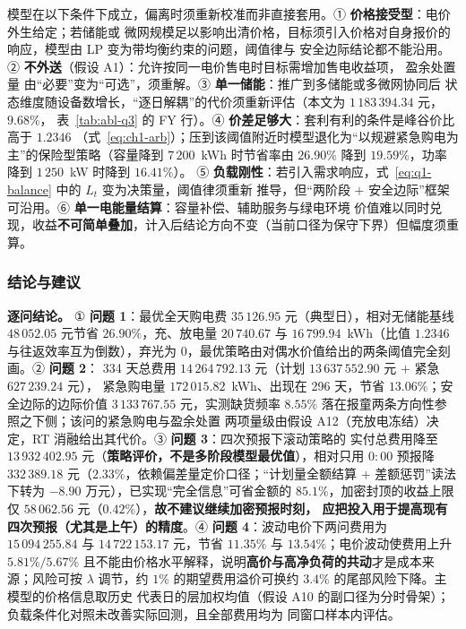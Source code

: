 模型在以下条件下成立，偏离时须重新校准而非直接套用。① \textbf{价格接受型}：电价外生给定；若储能或
微网规模足以影响出清价格，目标须引入价格对自身报价的响应，模型由 LP 变为带均衡约束的问题，阈值律与
安全边际结论都不能沿用。② \textbf{不外送}（假设 A1）：允许按同一电价售电时目标需增加售电收益项，
盈余处置量  由“必要”变为“可选”，须重解。③ \textbf{单一储能}：推广到多储能或多微网协同后
状态维度随设备数增长，“逐日解耦”的代价须重新评估（本文为 \(1\,183\,394.34\) 元，\(9.68\%\)，
表~\ref{tab:abl-q3} 的 FY 行）。④ \textbf{价差足够大}：套利有利的条件是峰谷价比高于 \(1.2346\)
（式~\eqref{eq:ch1-arb}）；压到该阈值附近时模型退化为“以规避紧急购电为主”的保险型策略（容量降到
\(7\,200\)~kWh 时节省率由 \(26.90\%\) 降到 \(19.59\%\)，功率降到 \(1\,250\)~kW 时降到 \(16.41\%\)）。
⑤ \textbf{负载刚性}：若引入需求响应，式~\eqref{eq:q1-balance} 中的 \(L_t\) 变为决策量，阈值律须重新
推导，但“两阶段 \(+\) 安全边际”框架可沿用。⑥ \textbf{单一电能量结算}：容量补偿、辅助服务与绿电环境
价值难以同时兑现，收益\textbf{不可简单叠加}，计入后结论方向不变（当前口径为保守下界）但幅度须重算。

\subsubsection{结论与建议}

\textbf{逐问结论。} ① \textbf{问题 1}：最优全天购电费 \(35\,126.95\) 元（典型日），相对无储能基线
\(48\,052.05\) 元节省 \(26.90\%\)，充、放电量 \(20\,740.67\) 与 \(16\,799.94\)~kWh（比值 \(1.2346\)
与往返效率互为倒数），弃光为 0，最优策略由对偶水价值给出的两条阈值完全刻画。② \textbf{问题 2}：
334 天总费用 \(14\,264\,792.13\) 元（计划 \(13\,637\,552.90\) 元 \(+\) 紧急 \(627\,239.24\) 元），
紧急购电量 \(172\,015.82\)~kWh、出现在 296 天，节省 \(13.06\%\)；安全边际的边际价值
\(3\,133\,767.55\) 元，实测缺货频率 \(8.55\%\) 落在报童两条方向性参照之下侧；该问的紧急购电与盈余处置
两项量级由假设 A12（充放电冻结）决定，RT 消融给出其代价。③ \textbf{问题 3}：四次预报下滚动策略的
实付总费用降至 \(13\,932\,402.95\) 元（\textbf{策略评价，不是多阶段模型最优值}），相对只用 \(0{:}00\)
预报降 \(332\,389.18\) 元（\(2.33\%\)，依赖偏差量定价口径；“计划量全额结算 \(+\) 差额惩罚”读法下转为
\(-8.90\) 万元），已实现“完全信息”可省金额的
\(85.1\%\)，加密封顶的收益上限仅 \(58\,062.56\) 元（\(0.42\%\)），\textbf{故不建议继续加密预报时刻，
应把投入用于提高现有四次预报（尤其是上午）的精度}。④ \textbf{问题 4}：波动电价下两问费用为
\(15\,094\,255.84\) 与 \(14\,722\,153.17\) 元，节省 \(11.35\%\) 与 \(13.54\%\)；电价波动使费用上升
\(5.81\%/5.67\%\) 且不能由价格水平解释，说明\textbf{高价与高净负荷的共动}才是成本来源；风险可按
\(\lambda\) 调节，约 \(1\%\) 的期望费用溢价可换约 \(3.4\%\) 的尾部风险下降。主模型的价格信息取历史
代表日的层加权均值（假设 A10 的副口径为分时骨架）；负载条件化对照未改善实际回测，且全部费用均为
同窗口样本内评估。

